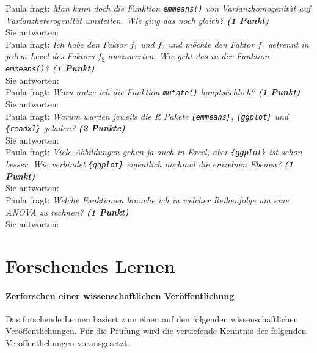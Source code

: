 \documentclass[a4paper, 9pt]{scrartcl}\usepackage[]{graphicx}\usepackage[]{xcolor}
\begin{document}
Paula fragt: \textit{Man kann doch die Funktion \texttt{emmeans()} von Varianzhomogenität auf Varianzheterogenität umstellen. Wie ging das noch gleich? \textbf{(1 Punkt)}}\\[1ex]
Sie antworten:\\[2Ex]

Paula fragt: \textit{Ich habe den Faktor $f_1$ und $f_2$ und möchte den Faktor $f_1$ getrennt in jedem Level des Faktors $f_2$ auszuwerten. Wie geht das in der Funktion \texttt{emmeans()}? \textbf{(1 Punkt)}}\\[1ex]
Sie antworten:\\[2Ex]

Paula fragt: \textit{Wozu nutze ich die Funktion \texttt{mutate()} hauptsächlich? \textbf{(1 Punkt)}}\\[1ex]
Sie antworten:\\[2Ex]

Paula fragt: \textit{Warum wurden jeweils die R Pakete \texttt{\{emmeans\}}, \texttt{\{ggplot\}} und \texttt{\{readxl\}} geladen? \textbf{(2 Punkte)}}\\[1ex]
Sie antworten:\\[2Ex]

Paula fragt: \textit{Viele Abbildungen gehen ja auch in Excel, aber \texttt{\{ggplot\}} ist schon besser. Wie verbindet \texttt{\{ggplot\}} eigentlich nochmal die einzelnen Ebenen? \textbf{(1 Punkt)}}\\[1ex]
Sie antworten:\\[2Ex]

Paula fragt: \textit{Welche Funktionen brauche ich in welcher Reihenfolge um eine ANOVA zu rechnen? \textbf{(1 Punkt)}}\\[1ex]
Sie antworten:\\[2Ex]



 
\clearpage
\part{Forschendes Lernen}

\subsection*{Zerforschen einer wissenschaftlichen Veröffentlichung}

Das forschende Lernen basiert zum einen auf den folgenden wissenschaftlichen Veröffentlichungen. Für die Prüfung wird die vertiefende Kenntnis der folgenden Veröffentlichungen vorausgesetzt.\\
\end{document}
